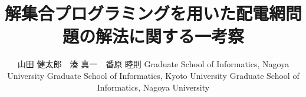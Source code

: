 \documentclass[T]{compsoft}
\begin{document}
\title{解集合プログラミングを用いた配電網問題の解法に関する一考察
}

%
\author{山田 健太郎　湊 真一　番原 睦則
%
%
%
%
%
{Graduate School of Informatics, Nagoya University}
%
{Graduate School of Informatics, Kyoto University}
%
{Graduate School of Informatics, Nagoya University}}



\maketitle \thispagestyle {empty}









\end{document}
